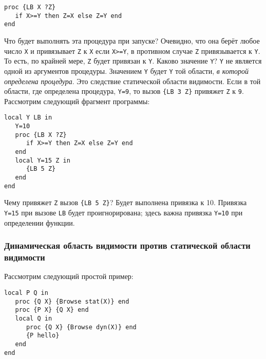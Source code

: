 \begin{lstlisting}
proc {LB X ?Z}
   if X>=Y then Z=X else Z=Y end
end
\end{lstlisting}

Что будет выполнять эта процедура при запуске? Очевидно, что она берёт любое число \lstinline|X| и привязывает \lstinline|Z| к \lstinline|X| если \lstinline|X>=Y|, в противном случае \lstinline|Z| привязывается к \lstinline|Y|. То есть, по крайней мере, \lstinline|Z| будет привязан к \lstinline|Y|. Каково значение \lstinline|Y|? \lstinline|Y| не является одной из аргументов процедуры. Значением \lstinline|Y| будет \lstinline|Y| той области, \emph{в которой определена процедура}. Это следствие статической области видимости. Если в той области, где определена процедура, \lstinline|Y=9|, то вызов \lstinline|{LB 3 Z}| привяжет \lstinline|Z| к \lstinline|9|. Рассмотрим следующий фрагмент программы:

\begin{lstlisting}
local Y LB in
   Y=10
   proc {LB X ?Z}
      if X>=Y then Z=X else Z=Y end
   end
   local Y=15 Z in
      {LB 5 Z}
   end
end
\end{lstlisting}

Чему привяжет \lstinline|Z| вызов \lstinline|{LB 5 Z}|? Будет выполнена привязка к 10. Привязка \lstinline|Y=15| при вызове \lstinline|LB| будет проигнорирована; здесь важна привязка \lstinline|Y=10| при определении функции.

\subsubsection{Динамическая область видимости против статической области видимости}

Рассмотрим следующий простой пример:

\begin{lstlisting}
local P Q in
   proc {Q X} {Browse stat(X)} end
   proc {P X} {Q X} end
   local Q in
      proc {Q X} {Browse dyn(X)} end
      {P hello}
   end
end
\end{lstlisting}

